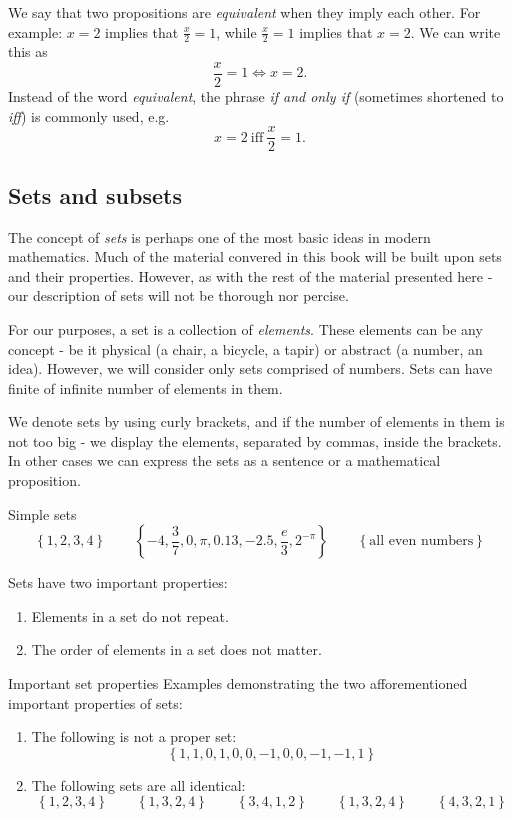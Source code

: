 We say that two propositions are \emph{equivalent} when they imply each other. For example: $x=2$ implies that $\frac{x}{2}=1$, while $\frac{x}{2}=1$ implies that $x=2$. We can write this as
\[
	\frac{x}{2}=1 \Leftrightarrow x=2.
\]
Instead of the word \textit{equivalent}, the phrase \textit{if and only if} (sometimes shortened to \emph{iff}) is commonly used, e.g.
\[
	x=2\ \text{iff}\ \frac{x}{2}=1.
\]

\subsection{Sets and subsets}
The concept of \emph{sets} is perhaps one of the most basic ideas in modern mathematics. Much of the material convered in this book will be built upon sets and their properties. However, as with the rest of the material presented here - our description of sets will not be thorough nor percise.

For our purposes, a set is a collection of \emph{elements}. These elements can be any concept - be it physical (a chair, a bicycle, a tapir) or abstract (a number, an idea). However, we will consider only sets comprised of numbers. Sets can have finite of infinite number of elements in them.

We denote sets by using curly brackets, and if the number of elements in them is not too big - we display the elements, separated by commas, inside the brackets. In other cases we can express the sets as a sentence or a mathematical proposition.

\begin{example}{Simple sets}{}
	\[
		\left\{ 1,2,3,4 \right\}\qquad\left\{ -4,\frac{3}{7},0,\pi,0.13,-2.5,\frac{e}{3},2^{-\pi} \right\}\qquad\left\{ \text{all even numbers} \right\}
	\]
\end{example}

Sets have two important properties:
\begin{enumerate}
	\item Elements in a set do not repeat.
	\item The order of elements in a set does not matter.
\end{enumerate}

\begin{example}{Important set properties}{}
	Examples demonstrating the two afforementioned important properties of sets:
	\begin{enumerate}
		\item The following is not a proper set:
		\[
			\left\{ 1,1,0,1,0,0,-1,0,0,-1,-1,1 \right\}
	\]

		\item The following sets are all identical:
		\[
			\left\{ 1,2,3,4 \right\}\qquad\left\{ 1,3,2,4  \right\}\qquad\left\{ 3,4,1,2 \right\}\qquad\left\{ 1,3,2,4 \right\}\qquad\left\{ 4,3,2,1 \right\}
		\]
	\end{enumerate}
	
\end{example}

